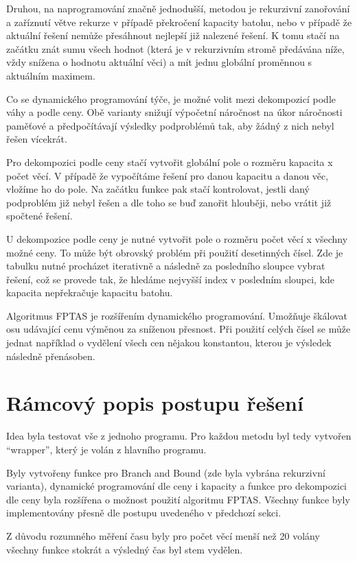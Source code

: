 \documentclass[a4paper]{article}
\begin{document}
	Druhou, na naprogramování značně jednodušší, metodou je rekurzivní zanořování a zaříznutí větve rekurze v případě překročení kapacity batohu, nebo v případě že aktuální řešení nemůže přesáhnout nejlepší již nalezené řešení. K tomu stačí na začátku znát sumu všech hodnot (která je v rekurzivním stromě předávána níže, vždy snížena o hodnotu aktuální věci) a mít jednu globální proměnnou s aktuálním maximem.
	
	Co se dynamického programování týče, je možné volit mezi dekompozicí podle váhy a podle ceny. Obě varianty snižují výpočetní náročnost na úkor náročnosti paměťové a předpočítávají výsledky podproblémů tak, aby žádný z nich nebyl řešen vícekrát.
	
	Pro dekompozici podle ceny stačí vytvořit globální pole o rozměru kapacita x počet věcí. V případě že vypočítáme řešení pro danou kapacitu a danou věc, vložíme ho do pole. Na začátku funkce pak stačí kontrolovat, jestli daný podproblém již nebyl řešen a dle toho se buď zanořit hlouběji, nebo vrátit již spočtené řešení.
	
	U dekompozice podle ceny je nutné vytvořit pole o rozměru počet věcí x všechny možné ceny. To může být obrovský problém při použití desetinných čísel. Zde je tabulku nutné procházet iterativně a následně za posledního sloupce vybrat řešení, což se provede tak, že hledáme nejvyšší index v posledním sloupci, kde kapacita nepřekračuje kapacitu batohu.
	
	Algoritmus FPTAS je rozšířením dynamického programování. Umožňuje škálovat osu udávající cenu výměnou za sníženou přesnost. Při použití celých čísel se může jednat například o vydělení všech cen nějakou konstantou, kterou je výsledek následně přenásoben.

\section{Rámcový popis postupu řešení}
	Idea byla testovat vše z jednoho programu. Pro každou metodu byl tedy vytvořen \enquote{wrapper}, který je volán z hlavního programu.
	
	Byly vytvořeny funkce pro Branch and Bound (zde byla vybrána rekurzivní varianta), dynamické programování dle ceny i kapacity a funkce pro dekompozici dle ceny byla rozšířena o možnost použití algoritmu FPTAS. Všechny funkce byly implementovány přesně dle postupu uvedeného v předchozí sekci.
	
	Z důvodu rozumného měření času byly pro počet věcí menší než 20 volány všechny funkce stokrát a výsledný čas byl stem vydělen.
	
\end{document}
